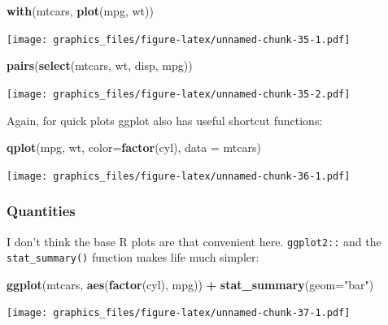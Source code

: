 \documentclass[]{article}
\newenvironment{Shaded}{\begin{snugshade}}{\end{snugshade}}
\newcommand{\KeywordTok}[1]{\textcolor[rgb]{0.13,0.29,0.53}{\textbf{#1}}}
\newcommand{\DataTypeTok}[1]{\textcolor[rgb]{0.13,0.29,0.53}{#1}}
\newcommand{\StringTok}[1]{\textcolor[rgb]{0.31,0.60,0.02}{#1}}
\newcommand{\OperatorTok}[1]{\textcolor[rgb]{0.81,0.36,0.00}{\textbf{#1}}}
\newcommand{\NormalTok}[1]{#1}
\theoremstyle{definition}
\theoremstyle{definition}
\theoremstyle{definition}
\theoremstyle{remark}
\begin{document}
\begin{Shaded}
\begin{Highlighting}[]
\KeywordTok{with}\NormalTok{(mtcars, }\KeywordTok{plot}\NormalTok{(mpg, wt))}
\end{Highlighting}
\end{Shaded}

\texttt{[image: graphics\_files/figure-latex/unnamed-chunk-35-1.pdf]}

\begin{Shaded}
\begin{Highlighting}[]
\KeywordTok{pairs}\NormalTok{(}\KeywordTok{select}\NormalTok{(mtcars, wt, disp, mpg))}
\end{Highlighting}
\end{Shaded}

\texttt{[image: graphics\_files/figure-latex/unnamed-chunk-35-2.pdf]}

Again, for quick plots ggplot also has useful shortcut functions:

\begin{Shaded}
\begin{Highlighting}[]
\KeywordTok{qplot}\NormalTok{(mpg, wt, }\DataTypeTok{color=}\KeywordTok{factor}\NormalTok{(cyl), }\DataTypeTok{data =}\NormalTok{ mtcars)}
\end{Highlighting}
\end{Shaded}

\texttt{[image: graphics\_files/figure-latex/unnamed-chunk-36-1.pdf]}

\subsubsection{Quantities}\label{quantities}

I don't think the base R plots are that convenient here.
\texttt{ggplot2::} and the \texttt{stat\_summary()} function makes life
much simpler:

\begin{Shaded}
\begin{Highlighting}[]
\KeywordTok{ggplot}\NormalTok{(mtcars, }\KeywordTok{aes}\NormalTok{(}\KeywordTok{factor}\NormalTok{(cyl), mpg)) }\OperatorTok{+}\StringTok{ }
\StringTok{  }\KeywordTok{stat_summary}\NormalTok{(}\DataTypeTok{geom=}\StringTok{"bar"}\NormalTok{)}
\end{Highlighting}
\end{Shaded}

\texttt{[image: graphics\_files/figure-latex/unnamed-chunk-37-1.pdf]}
\end{document}

